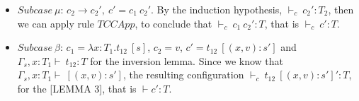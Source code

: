\documentclass {article}
\newcommand{\tto}{\longrightarrow}
\newcommand{\confxE}[1]{#1 \ [(x,v):s']}
\newcommand{\subx}{[(x,v):s']}
\newcommand{\envEC}{{\Gamma_s , x:T_1 \vdash \ }}
\newcommand{\tyC}{{\vdash_c \ }}
\begin{document}
\begin{enumerate}
\begin{itemize}
\item $Subcase \ \mu$: $c_2 \tto c_2', \ c' = c_1 \ c_2'$. By the induction hypothesis, $\tyC c_2' : T_2 $, then we can apply rule $TCCApp$, to conclude that $\tyC c_1 \ c_2' : T$, that is $\tyC c' : T$.

\item $Subcase \ \beta$: $c_1 = \lambda x:T_{1}.t_{12}\ [s]$, $c_2 = v$, $c' = \confxE{t_{12}}$ and $\envEC t_{12}: T$ for the inversion lemma. Since we know that $\envEC \subx$, the resulting configuration $\tyC \confxE {t_{12}}':T$, for the [LEMMA 3], that is $\vdash c' : T$.
\end{itemize}
\end{enumerate}
\end{document}
